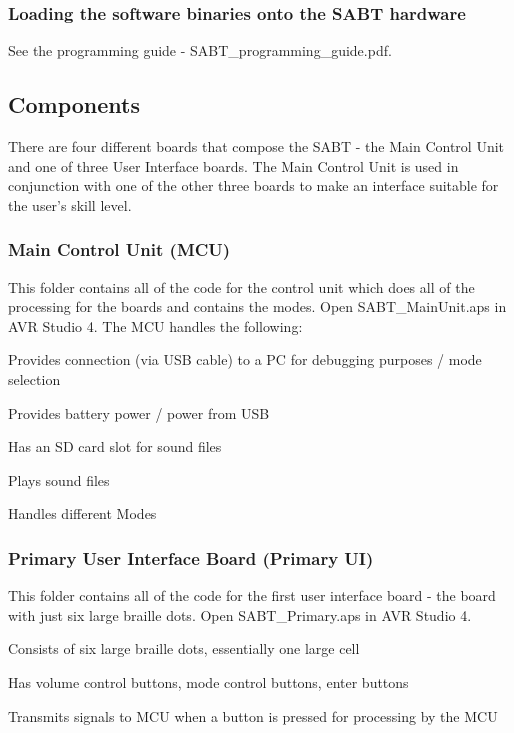 \subsubsection*{Loading the software binaries onto the S\-A\-B\-T hardware}

See the programming guide -\/ S\-A\-B\-T\-\_\-programming\-\_\-guide.\-pdf.

\subsection*{Components}

There are four different boards that compose the S\-A\-B\-T -\/ the Main Control Unit and one of three User Interface boards. The Main Control Unit is used in conjunction with one of the other three boards to make an interface suitable for the user's skill level. \subsubsection*{Main Control Unit (M\-C\-U)}

This folder contains all of the code for the control unit which does all of the processing for the boards and contains the modes. Open S\-A\-B\-T\-\_\-\-Main\-Unit.\-aps in A\-V\-R Studio 4. The M\-C\-U handles the following\-:
\begin{DoxyItemize}
\item Provides connection (via U\-S\-B cable) to a P\-C for debugging purposes / mode selection
\item Provides battery power / power from U\-S\-B
\item Has an S\-D card slot for sound files
\item Plays sound files
\item Handles different Modes
\end{DoxyItemize}

\subsubsection*{Primary User Interface Board (Primary U\-I)}

This folder contains all of the code for the first user interface board -\/ the board with just six large braille dots. Open S\-A\-B\-T\-\_\-\-Primary.\-aps in A\-V\-R Studio 4.
\begin{DoxyItemize}
\item Consists of six large braille dots, essentially one large cell
\item Has volume control buttons, mode control buttons, enter buttons
\item Transmits signals to M\-C\-U when a button is pressed for processing by the M\-C\-U
\end{DoxyItemize}


